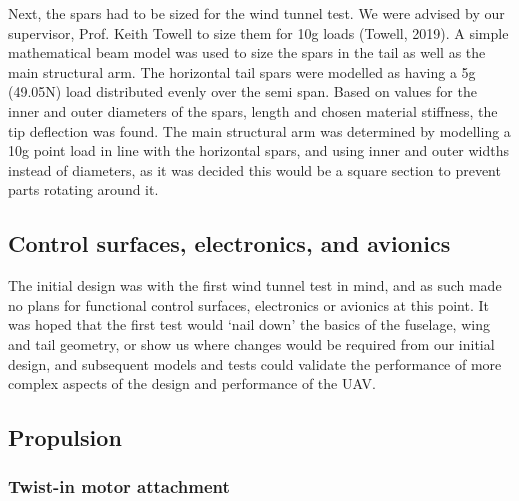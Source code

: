 \documentclass[../../main.tex]{subfiles}
\begin{document}
Next, the spars had to be sized for the wind tunnel test.
We were advised by our supervisor, Prof. Keith Towell to size them for 10g loads (Towell, 2019).
A simple mathematical beam model was used to size the spars in the tail as well as the main structural arm.
The horizontal tail spars were modelled as having a 5g (49.05N) load distributed evenly over the semi span.
Based on values for the inner and outer diameters of the spars, length and chosen material stiffness, the tip deflection was found.
The main structural arm was determined by modelling a 10g point load in line with the horizontal spars, and using inner and outer widths instead of diameters, as it was decided this would be a square section to prevent parts rotating around it.

\subsection{Control surfaces, electronics, and avionics} \label{sec:design-process:initial-designs:control-surfaces-electronics-and-avionics}

The initial design was with the first wind tunnel test in mind, and as such made no plans for functional control surfaces, electronics or avionics at this point.
It was hoped that the first test would ‘nail down’ the basics of the fuselage, wing and tail geometry, or show us where changes would be required from our initial design, and subsequent models and tests could validate the performance of more complex aspects of the design and performance of the UAV. 

\subsection{Propulsion} \label{sec:design-process:initial-designs:propulsion}

\subsubsection{Twist-in motor attachment} \label{sec:design-process:initial-designs:propulsion:twist-in-motor-attachment}

\end{document}
